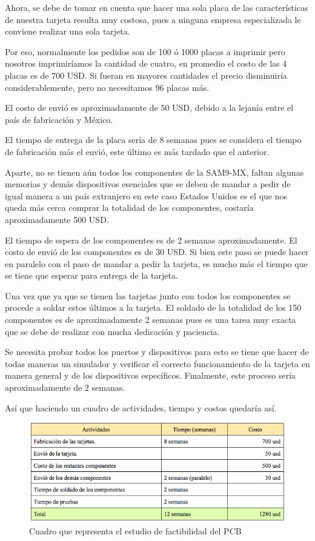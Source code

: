 Ahora, se debe de tomar en cuenta que hacer una sola placa de las características de nuestra tarjeta resulta muy costosa, pues a ninguna empresa especializada le conviene realizar una sola tarjeta. 

Por eso, normalmente los pedidos son de 100 ó 1000 placas a imprimir pero nosotros imprimiríamos la cantidad de cuatro, en promedio el costo de las 4 placas es de 700 USD. Si fueran en mayores cantidades el precio disminuiría considerablemente, pero no necesitamos 96 placas más.

El costo de envió es aproximadamente de 50 USD, debido a la lejanía entre el país de fabricación y México.

El tiempo de entrega de la placa sería de 8 semanas pues se considera el tiempo de fabricación más el envió, este último es más tardado que el anterior.

Aparte, no se tienen aún todos los componentes de la SAM9-MX, faltan algunas memorias y demás dispositivos esenciales que se deben de mandar a pedir de igual manera a un país extranjero en este caso Estados Unidos es el que nos queda más cerca  comprar la totalidad de los componentes, costaría aproximadamente 500 USD.

El tiempo de espera de los componentes es de 2 semanas aproximadamente. El costo de envió de los componentes es de 30 USD. Si bien este paso se puede hacer en paralelo con el paso de mandar a pedir la tarjeta, es mucho más el tiempo que se tiene que esperar para entrega de la tarjeta.

Una vez que ya que se tienen las tarjetas junto con todos los componentes se procede a soldar estos últimos a la tarjeta. El soldado de la totalidad de los 150 componentes es de aproximadamente 2 semanas pues es una tarea muy exacta que se debe de realizar con mucha dedicación y paciencia.

Se necesita probar todos los puertos y dispositivos para esto se tiene que hacer de todas maneras un simulador y verificar el correcto funcionamiento de la tarjeta en manera general y de los dispositivos específicos. Finalmente, este proceso sería aproximadamente de 2 semanas.

Así que haciendo un cuadro de actividades, tiempo y costos quedaría así.

\begin{figure}
\includegraphics[scale=0.6,angle=0]{img/cuadroPCB.png}\caption{Cuadro que representa el estudio de factibilidad del PCB}
\label{Flo:cuadroPCB}
\end{figure}

